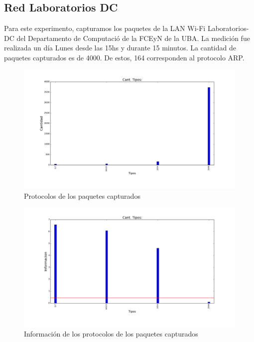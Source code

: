 \subsection{Red Laboratorios DC}

Para este experimento, capturamos los paquetes de la LAN Wi-Fi Laboratorios-DC del Departamento de Computació de la FCEyN de la UBA. La medición fue realizada un día Lunes desde las 15hs y durante 15 minutos. La cantidad de paquetes capturados es de 4000. De estos, 164 corresponden al protocolo ARP.

\begin{figure}[H]
       \centering
       \includegraphics[width=1\textwidth]{../resultados/labo-corrida3/histogram_types.png}
       \caption{Protocolos de los paquetes capturados}
       \label{red-Starbucks-types}
\end{figure}

\begin{figure}[H]
       \centering
       \includegraphics[width=1\textwidth]{../resultados/labo-corrida3/histogram_types_information.png}
       \caption{Información de los protocolos de los paquetes capturados}
       \label{red-Starbucks-types-information}
\end{figure}

